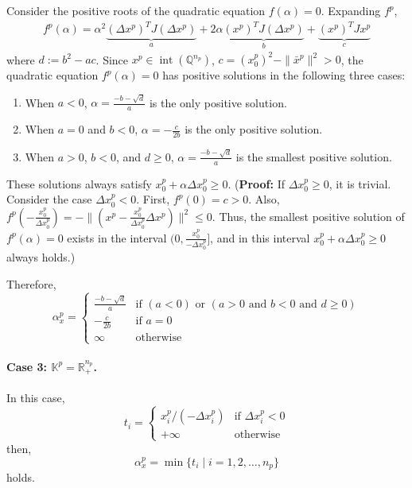 \documentclass{scrartcl}
\begin{document}
Consider the positive roots of the quadratic equation $f(\alpha)=0$. %
Expanding $f^p$,
\begin{align*}
    f^p(\alpha) = \alpha^2\underbrace{(\Delta x^p)^T J (\Delta x^p)}_a + 2 \alpha \underbrace{(x^p)^T J (\Delta x^p)}_b + \underbrace{(x^p)^T J x^p}_c
\end{align*}
where $d:=b^2-ac$.
Since $x^p\in \operatorname{int}(\mathbb{Q}^{n_p})$, $c = (x^p_0)^2 - \|\bar{x}^p\|^2 > 0$, the quadratic equation $f^p(\alpha) = 0$ has positive solutions in the following three cases:
\begin{enumerate}
    \item When $a<0$, $\alpha=\frac{-b-\sqrt{d}}{a}$ is the only positive solution.
    \item When $a=0$ and $b<0$, $\alpha=-\frac{c}{2b}$ is the only positive solution.
    \item When $a>0$, $b<0$, and $d\geq 0$, $\alpha=\frac{-b-\sqrt{d}}{a}$ is the smallest positive solution.
\end{enumerate}
These solutions always satisfy $x^p_0+\alpha \Delta x^p_0\geq 0$.
(\textbf{Proof:} If $\Delta x^p_0 \geq 0$, it is trivial. Consider the case $\Delta x^p_0 < 0$. First, $f^p(0)=c>0$. Also,
$f^p(-\frac{x^p_0}{\Delta x^p_0}) = - \|(x^p -\frac{x^p_0}{\Delta x^p_0} \Delta x^p)\|^2 \leq 0$.
Thus, the smallest positive solution of $f^p(\alpha) = 0$ exists in the interval $\big(0, \frac{x^p_0}{-\Delta x^p_0}\big]$, and in this interval $x^p_0+\alpha \Delta x^p_0\geq 0$ always holds.)

Therefore,
\begin{equation*}
    \alpha^p_x=\begin{cases}
       \frac{-b - \sqrt{d}}{a} & \text{if } (a < 0) \text{ or } (a > 0 \text{ and } b < 0 \text{ and } d \geq 0)\\
       -\frac{c}{2b} & \text{if $a=0$} \\
       \infty & \text{otherwise}
    \end{cases}
\end{equation*}

\paragraph{Case 3: $\mathbb{K}^p = \mathbb{R}^{n_p}_+$.}
In this case,
\[
t_i= \begin{cases}
    x^p_i / (-\Delta x^p_i) & \text{if } \Delta x^p_i < 0 \\
    +\infty & \text{otherwise}
\end{cases}
\]
then,
\[
    \alpha^p_x = \min\{t_i \mid i=1,2,\ldots,n_p\}
\]
holds.
\end{document}
